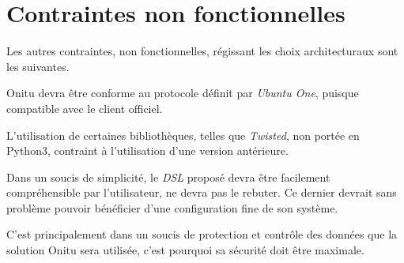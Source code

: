 \section{Contraintes non fonctionnelles}

Les autres contraintes, non fonctionnelles, régissant les choix
architecturaux sont les suivantes.

Onitu devra être conforme au protocole définit par \emph{Ubuntu One},
puisque compatible avec le client officiel.

L'utilisation de certaines bibliothèques, telles que \emph{Twisted}, non
portée en Python3, contraint à l'utilisation d'une version antérieure.

Dans un soucis de simplicité, le \emph{DSL} proposé devra être
facilement compréhensible par l'utilisateur, ne devra pas le rebuter. Ce
dernier devrait sans problème pouvoir bénéficier d'une configuration
fine de son système.

C'est principalement dans un soucis de protection et contrôle des
données que la solution Onitu sera utilisée, c'est pourquoi sa sécurité
doit être maximale.
